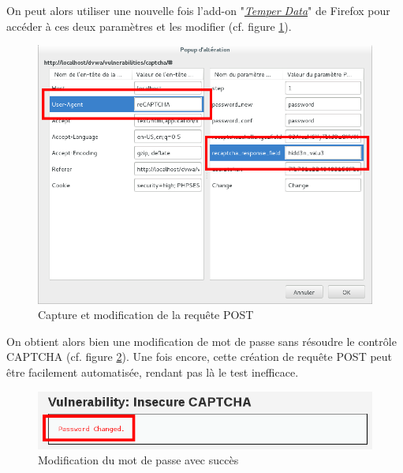 On peut alors utiliser une nouvelle fois l'add-on "\href{https://addons.mozilla.org/fr/firefox/addon/tamper-data/}{\textit{Temper Data}}" de Firefox pour accéder à ces deux paramètres et les modifier (cf. figure \ref{captcha5}).

\begin{figure}[!h]
\begin{center}

\includegraphics[scale=0.5]{images/captcha5.png}

\caption{Capture et modification de la requête POST}
\label{captcha5}
\end{center}
\end{figure}

On obtient alors bien une modification de mot de passe sans résoudre le contrôle CAPTCHA (cf. figure \ref{captcha6}). Une fois encore, cette création de requête POST peut être facilement automatisée, rendant pas là le test inefficace.\\

\begin{figure}[!h]
\begin{center}

\includegraphics[scale=0.5]{images/captcha6.png}

\caption{Modification du mot de passe avec succès}
\label{captcha6}
\end{center}
\end{figure}

